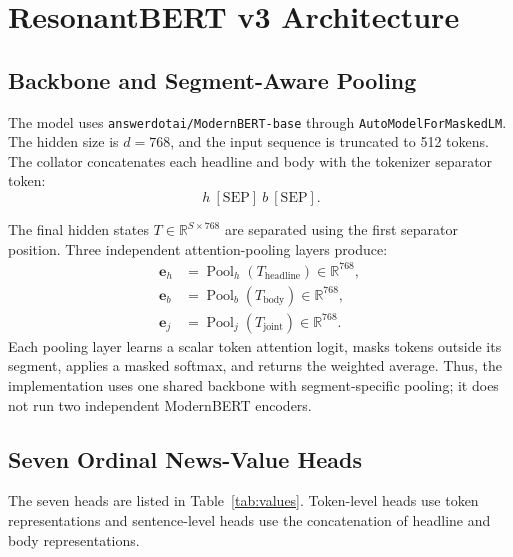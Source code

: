 \documentclass[11pt]{article}
\begin{document}
\section{ResonantBERT v3 Architecture}

\subsection{Backbone and Segment-Aware Pooling}

The model uses \texttt{answerdotai/ModernBERT-base} through \texttt{AutoModelForMaskedLM}. The hidden size is $d=768$, and the input sequence is truncated to 512 tokens. The collator concatenates each headline and body with the tokenizer separator token:
\begin{equation}
    [\mathrm{CLS}]\ h\ [\mathrm{SEP}]\ b\ [\mathrm{SEP}].
\end{equation}

The final hidden states $T \in \mathbb{R}^{S\times 768}$ are separated using the first separator position. Three independent attention-pooling layers produce:
\begin{align}
    \mathbf{e}_h &= \operatorname{Pool}_h(T_{\mathrm{headline}}) \in \mathbb{R}^{768},\\
    \mathbf{e}_b &= \operatorname{Pool}_b(T_{\mathrm{body}}) \in \mathbb{R}^{768},\\
    \mathbf{e}_j &= \operatorname{Pool}_j(T_{\mathrm{joint}}) \in \mathbb{R}^{768}.
\end{align}
Each pooling layer learns a scalar token attention logit, masks tokens outside its segment, applies a masked softmax, and returns the weighted average. Thus, the implementation uses one shared backbone with segment-specific pooling; it does not run two independent ModernBERT encoders.

\subsection{Seven Ordinal News-Value Heads}

The seven heads are listed in Table~\ref{tab:values}. Token-level heads use token representations and sentence-level heads use the concatenation of headline and body representations.
\end{document}
